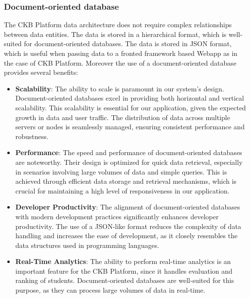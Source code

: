 \begin{itemize}
\subsubsection{Document-oriented database}
The CKB Platform data architecture does not require complex relationships between data entities. The data is stored in a hierarchical format, which is well-suited for document-oriented databases. The data is stored in JSON format, which is useful when passing data to a fronted framework based Webapp as in the case of CKB Platform. Moreover the use of a document-oriented database provides several benefits:
\begin{itemize}
\item \textbf{Scalability}: The ability to scale is paramount in our system's design. Document-oriented databases excel in providing both horizontal and vertical scalability. This scalability is essential for our application, given the expected growth in data and user traffic. The distribution of data across multiple servers or nodes is seamlessly managed, ensuring consistent performance and robustness.
\item \textbf{Performance}: The speed and performance of document-oriented databases are noteworthy. Their design is optimized for quick data retrieval, especially in scenarios involving large volumes of data and simple queries. This is achieved through efficient data storage and retrieval mechanisms, which is crucial for maintaining a high level of responsiveness in our application.
\item \textbf{Developer Productivity}: The alignment of document-oriented databases with modern development practices significantly enhances developer productivity. The use of a JSON-like format reduces the complexity of data handling and increases the ease of development, as it closely resembles the data structures used in programming languages.
\item \textbf{Real-Time Analytics}: The ability to perform real-time analytics is an important feature for the CKB Platform, since it handles evaluation and ranking of students. Document-oriented databases are well-suited for this purpose, as they can process large volumes of data in real-time.
\end{itemize}


\end{itemize}
